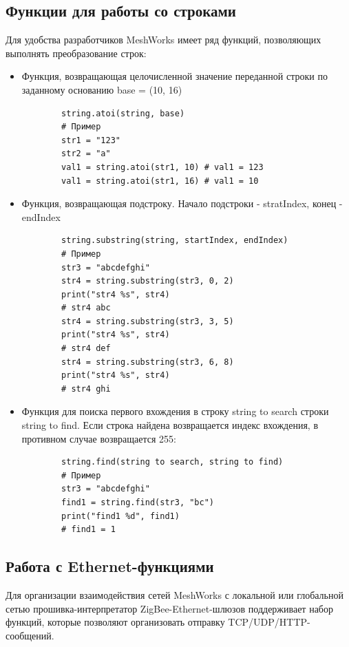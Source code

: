 \documentclass[12pt]{article}
\begin{document}
\subsection{Функции для работы со строками}
Для удобства разработчиков MeshWorks имеет ряд функций, позволяющих выполнять 
преобразование строк:
\begin{itemize}
    \item Функция, возвращающая целочисленной значение переданной строки по заданному
основанию base = (10, 16)\\
        \begin{verbatim}
        string.atoi(string, base)
        # Пример
        str1 = "123"
        str2 = "a"
        val1 = string.atoi(str1, 10) # val1 = 123
        val1 = string.atoi(str1, 16) # val1 = 10
        \end{verbatim}
    \item Функция, возвращающая подстроку. Начало подстроки - stratIndex, конец - 
endIndex\\
        \begin{verbatim}
        string.substring(string, startIndex, endIndex)
        # Пример
        str3 = "abcdefghi"
        str4 = string.substring(str3, 0, 2)
        print("str4 %s", str4)
        # str4 abc
        str4 = string.substring(str3, 3, 5)
        print("str4 %s", str4)
        # str4 def
        str4 = string.substring(str3, 6, 8)
        print("str4 %s", str4)
        # str4 ghi
        \end{verbatim}
    \item Функция для поиска первого вхождения в строку string to search строки
string to find. Если строка найдена возвращается индекс вхождения, в противном 
случае возвращается 255:
        \begin{verbatim}
        string.find(string to search, string to find)
        # Пример
        str3 = "abcdefghi"
        find1 = string.find(str3, "bc")
        print("find1 %d", find1)
        # find1 = 1
        \end{verbatim}
\end{itemize}
\subsection{Работа с Ethernet-функциями}
Для организации взаимодействия сетей MeshWorks с локальной или глобальной сетью
прошивка-интерпретатор ZigBee-Ethernet-шлюзов поддерживает набор функций, которые
позволяют организовать отправку TCP/UDP/HTTP-сообщений.
\end{document}
